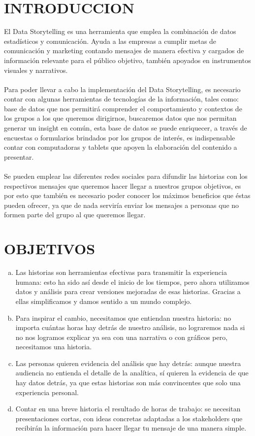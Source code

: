 \documentclass[preprint,12pt]{elsarticle}
\begin{document}
	\newpage
	\section{INTRODUCCION}
	\label{S:1}
	El Data Storytelling es una herramienta que emplea la combinación de datos estadísticos y comunicación. Ayuda a las empresas a cumplir metas de comunicación y marketing contando mensajes de manera efectiva y cargados de información relevante para el público objetivo, también apoyados en instrumentos visuales y narrativos.\\
	\\
	Para poder llevar a cabo la implementación del Data Storytelling, es necesario contar con algunas herramientas de tecnologías de la información, tales como: base de datos que nos permitirá comprender el comportamiento y contextos de los grupos a los que queremos dirigirnos, buscaremos datos que nos permitan generar un insight en común, esta base de datos se puede enriquecer, a través de encuestas o formularios brindados por los grupos de interés, es indispensable contar con computadoras y tablets que apoyen la elaboración del contenido a presentar.\\
	\\
	Se pueden emplear las diferentes redes sociales para difundir las historias con los respectivos mensajes que queremos hacer llegar a nuestros grupos objetivos, es por esto que también es necesario poder conocer los máximos beneficios que éstas pueden ofrecer, ya que de nada serviría enviar los mensajes a personas que no formen parte del grupo al que queremos llegar.
	
	\section{OBJETIVOS}
		\begin{enumerate}[a)]
			\item Las historias son herramientas efectivas para transmitir la experiencia humana: esto ha sido así desde el inicio de los tiempos, pero ahora utilizamos datos y análisis para crear versiones mejoradas de esas historias. Gracias a ellas simplificamos y damos sentido a un mundo complejo.
			\\
			\item Para inspirar el cambio, necesitamos que entiendan nuestra historia: no importa cuántas horas hay detrás de nuestro análisis, no lograremos nada si no nos logramos explicar ya sea con una narrativa o con gráficos pero, necesitamos una historia.
			\\
			\item Las personas quieren evidencia del análisis que hay detrás: aunque nuestra audiencia no entienda el detalle de la analítica, sí quieren la evidencia de que hay datos detrás, ya que estas historias son más convincentes que solo una experiencia personal.
			\\
			\item Contar en una breve historia el resultado de horas de trabajo: se necesitan presentaciones cortas, con ideas concretas adaptadas a los stakeholders que recibirán la información para hacer llegar tu mensaje de una manera simple. 
		\end{enumerate}
	
\end{document}

